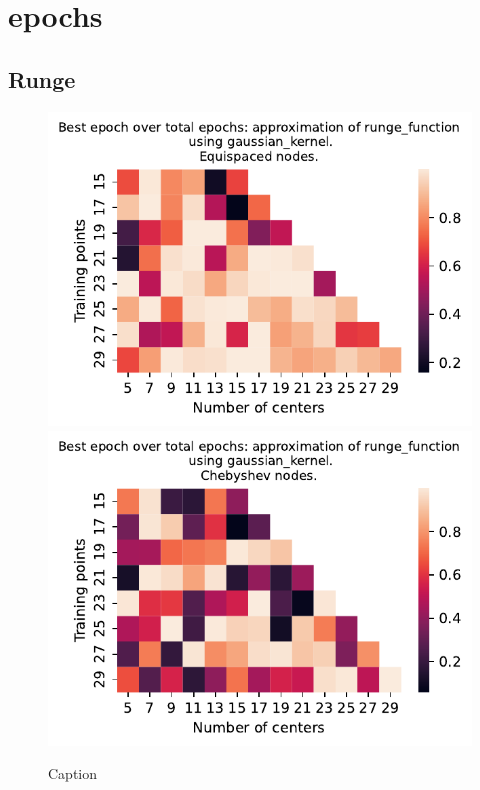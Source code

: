\documentclass[12pt]{report} %
\begin{document}
\section*{epochs}

\subsection*{Runge}

\begin{figure}[ht]
    \centering
    
    \includegraphics[width=.49\textwidth]{imagenes/experiments/1d/variational_epochs/runge_function-Kgaussian_kernel-Equi-epochs.pdf}
    \includegraphics[width=.49\textwidth]{imagenes/experiments/1d/variational_epochs/runge_function-Kgaussian_kernel-Cheb-epochs.pdf}
    \caption{Caption}
    \label{fig:epochs-runge-gaussian}
\end{figure}
\end{document}
